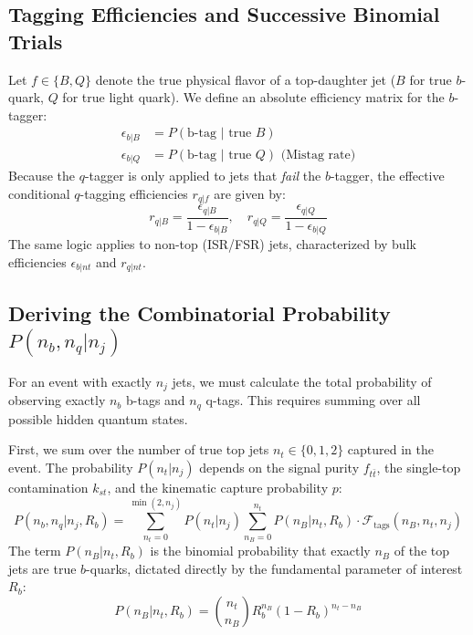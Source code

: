 \documentclass[11pt,a4paper]{article}
\begin{document}
\subsection{Tagging Efficiencies and Successive Binomial Trials}
Let $f \in \{B, Q\}$ denote the true physical flavor of a top-daughter jet ($B$ for true $b$-quark, $Q$ for true light quark). We define an absolute efficiency matrix for the $b$-tagger:
\begin{align}
\epsilon_{b|B} &= P(\text{b-tag } | \text{ true } B) \\
\epsilon_{b|Q} &= P(\text{b-tag } | \text{ true } Q) \text{ (Mistag rate)}
\end{align}
Because the $q$-tagger is only applied to jets that \textit{fail} the $b$-tagger, the effective conditional $q$-tagging efficiencies $r_{q|f}$ are given by:
\begin{equation}
r_{q|B} = \frac{\epsilon_{q|B}}{1 - \epsilon_{b|B}}, \quad r_{q|Q} = \frac{\epsilon_{q|Q}}{1 - \epsilon_{b|Q}} \label{eq:conditional_q}
\end{equation}
The same logic applies to non-top (ISR/FSR) jets, characterized by bulk efficiencies $\epsilon_{b|nt}$ and $r_{q|nt}$.

\subsection{Deriving the Combinatorial Probability $P(n_b, n_q | n_j)$}
For an event with exactly $n_j$ jets, we must calculate the total probability of observing exactly $n_b$ b-tags and $n_q$ q-tags. This requires summing over all possible hidden quantum states.

First, we sum over the number of true top jets $n_t \in \{0,1,2\}$ captured in the event. The probability $P(n_t | n_j)$ depends on the signal purity $f_{t\bar{t}}$, the single-top contamination $k_{st}$, and the kinematic capture probability $p$:
\begin{equation}
P(n_b, n_q | n_j, R_b) = \sum_{n_t=0}^{\min(2, n_j)} P(n_t | n_j) \sum_{n_B=0}^{n_t} P(n_B | n_t, R_b) \cdot \mathcal{F}_{\text{tags}}(n_B, n_t, n_j)
\end{equation}
The term $P(n_B | n_t, R_b)$ is the binomial probability that exactly $n_B$ of the top jets are true $b$-quarks, dictated directly by the fundamental parameter of interest $R_b$:
\begin{equation}
P(n_B | n_t, R_b) = \binom{n_t}{n_B} R_b^{n_B} (1-R_b)^{n_t - n_B}
\end{equation}
\end{document}
